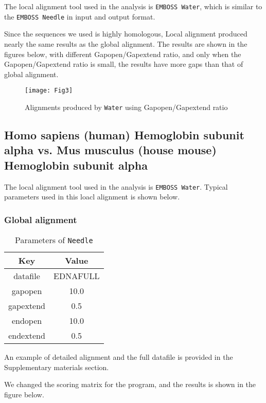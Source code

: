 \documentclass[en,black,10pt,normal]{elegantnote}
\newcommand{\upcite}[1]{\textsuperscript{\textsuperscript{\cite{#1}}}}
\begin{document}
The local alignment tool used in the analysis is \texttt{EMBOSS Water}\upcite{smith1981comparison}, 
which is similar to the \texttt{EMBOSS Needle} in input and output format.

Since the sequences we used is highly homologous, Local alignment produced nearly the same results as the global alignment.
The results are shown in the figures below, with different Gapopen/Gapextend ratio, and only when the Gapopen/Gapextend ratio
is small, the results have more gaps than that of global alignment.

\begin{figure}[H]
    \centering
    \texttt{[image: Fig3]}
    \caption{Alignments produced by \texttt{Water} using Gapopen/Gapextend ratio}
    \label{Fig3}
\end{figure}



\subsection{Homo sapiens (human) Hemoglobin subunit alpha vs. Mus musculus (house mouse) Hemoglobin subunit alpha}

The local alignment tool used in the analysis is \texttt{EMBOSS Water}. 
Typical parameters used in this loacl alignment is shown below.

\subsubsection{Global alignment}
\begin{table}[H]
    \caption{Parameters of \texttt{Needle}}
    \centering
    \begin{tabular}{cc}
        \toprule
        Key&Value\\
        \midrule
        datafile&EDNAFULL\\
        gapopen&10.0\\
        gapextend&0.5\\
        endopen&10.0\\
        endextend&0.5\\
        \bottomrule
    \end{tabular}
\end{table}

An example of detailed alignment and the full datafile is provided in the Supplementary materials section.

We changed the scoring matrix for the program, and the results is shown in the figure below.
\end{document}
